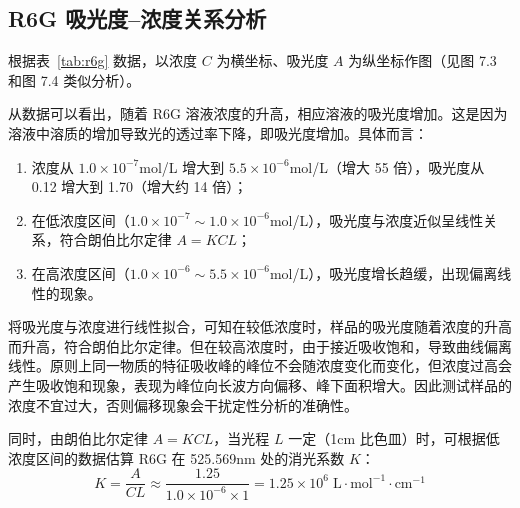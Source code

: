 \subsection{R6G 吸光度--浓度关系分析}

根据表~\ref{tab:r6g} 数据，以浓度 $C$ 为横坐标、吸光度 $A$ 为纵坐标作图（见图 7.3 和图 7.4 类似分析）。


从数据可以看出，随着 R6G 溶液浓度的升高，相应溶液的吸光度增加。这是因为溶液中溶质的增加导致光的透过率下降，即吸光度增加。具体而言：
\begin{enumerate}[label=\arabic*、, leftmargin=4em, labelsep=0pt]
    \item 浓度从 $1.0 \times 10^{-7}$mol/L 增大到 $5.5 \times 10^{-6}$mol/L（增大 55 倍），吸光度从 0.12 增大到 1.70（增大约 14 倍）；
    \item 在低浓度区间（$1.0 \times 10^{-7} \sim 1.0 \times 10^{-6}$mol/L），吸光度与浓度近似呈线性关系，符合朗伯比尔定律 $A = KCL$；
    \item 在高浓度区间（$1.0 \times 10^{-6} \sim 5.5 \times 10^{-6}$mol/L），吸光度增长趋缓，出现偏离线性的现象。
\end{enumerate}


将吸光度与浓度进行线性拟合，可知在较低浓度时，样品的吸光度随着浓度的升高而升高，符合朗伯比尔定律。但在较高浓度时，由于接近吸收饱和，导致曲线偏离线性。原则上同一物质的特征吸收峰的峰位不会随浓度变化而变化，但浓度过高会产生吸收饱和现象，表现为峰位向长波方向偏移、峰下面积增大。因此测试样品的浓度不宜过大，否则偏移现象会干扰定性分析的准确性。

同时，由朗伯比尔定律 $A = KCL$，当光程 $L$ 一定（1cm 比色皿）时，可根据低浓度区间的数据估算 R6G 在 525.569nm 处的消光系数 $K$：
\begin{equation}
    K = \frac{A}{CL} \approx \frac{1.25}{1.0 \times 10^{-6} \times 1} = 1.25 \times 10^{6}\;\text{L}\cdot\text{mol}^{-1}\cdot\text{cm}^{-1}
\end{equation}

